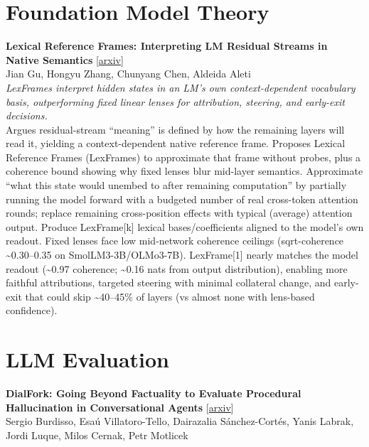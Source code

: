 \documentclass[12pt,letterpaper]{article}
\begin{document}
\medskip


\section*{Foundation Model Theory}

{\small\textbf{Lexical Reference Frames: Interpreting LM Residual Streams in Native Semantics}} {\scriptsize[\href{https://arxiv.org/abs/2610.22169}{arxiv}]}\\
{\scriptsize Jian Gu, Hongyu Zhang, Chunyang Chen, Aldeida Aleti}\\

{\small\textit{LexFrames interpret hidden states in an LM's own context-dependent vocabulary basis, outperforming fixed linear lenses for attribution, steering, and early-exit decisions.}}\\[1pt]
{\footnotesize Argues residual-stream ``meaning'' is defined by how the remaining layers will read it, yielding a context-dependent native reference frame. Proposes Lexical Reference Frames (LexFrames) to approximate that frame without probes, plus a coherence bound showing why fixed lenses blur mid-layer semantics. Approximate ``what this state would unembed to after remaining computation'' by partially running the model forward with a budgeted number of real cross-token attention rounds; replace remaining cross-position effects with typical (average) attention output. Produce LexFrame[k] lexical bases/coefficients aligned to the model's own readout. Fixed lenses face low mid-network coherence ceilings (sqrt-coherence \textasciitilde{}0.30--0.35 on SmolLM3-3B/OLMo3-7B). LexFrame[1] nearly matches the model readout (\textasciitilde{}0.97 coherence; \textasciitilde{}0.16 nats from output distribution), enabling more faithful attributions, targeted steering with minimal collateral change, and early-exit that could skip \textasciitilde{}40--45\% of layers (vs almost none with lens-based confidence).}

\medskip


\section*{LLM Evaluation}

{\small\textbf{DialFork: Going Beyond Factuality to Evaluate Procedural Hallucination in Conversational Agents}} {\scriptsize[\href{https://arxiv.org/abs/2610.21561}{arxiv}]}\\
{\scriptsize Sergio Burdisso, Esaú Villatoro-Tello, Dairazalia Sánchez-Cortés, Yanis Labrak, Jordi Luque, Milos Cernak, Petr Motlicek}\\
\end{document}

